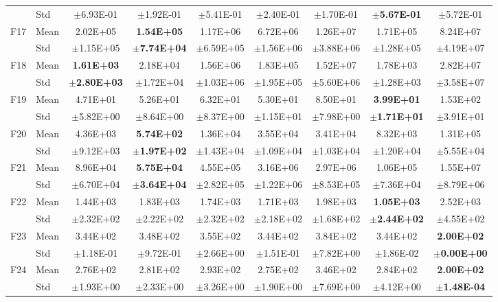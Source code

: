 \begin{table}[htbp]
{\begin{tabular}{clccccccc}
 & Std & $\pm$6.93E-01 & $\pm$1.92E-01 & $\pm$5.41E-01 & $\pm$2.40E-01 & $\pm$1.70E-01 & $\pm$\textbf{5.67E-01} & $\pm$5.72E-01 \\
F17 & Mean & 2.02E+05 & \textbf{1.54E+05} & 1.17E+06 & 6.72E+06 & 1.26E+07 & 1.71E+05 & 8.24E+07 \\
 & Std & $\pm$1.15E+05 & $\pm$\textbf{7.74E+04} & $\pm$6.59E+05 & $\pm$1.56E+06 & $\pm$3.88E+06 & $\pm$1.28E+05 & $\pm$4.19E+07 \\
F18 & Mean & \textbf{1.61E+03} & 2.18E+04 & 1.56E+06 & 1.83E+05 & 1.52E+07 & 1.78E+03 & 2.82E+07 \\
 & Std & $\pm$\textbf{2.80E+03} & $\pm$1.72E+04 & $\pm$1.03E+06 & $\pm$1.95E+05 & $\pm$5.60E+06 & $\pm$1.28E+03 & $\pm$3.58E+07 \\
F19 & Mean & 4.71E+01 & 5.26E+01 & 6.32E+01 & 5.30E+01 & 8.50E+01 & \textbf{3.99E+01} & 1.53E+02 \\
 & Std & $\pm$5.82E+00 & $\pm$8.64E+00 & $\pm$8.37E+00 & $\pm$1.15E+01 & $\pm$7.98E+00 & $\pm$\textbf{1.71E+01} & $\pm$3.91E+01 \\
F20 & Mean & 4.36E+03 & \textbf{5.74E+02} & 1.36E+04 & 3.55E+04 & 3.41E+04 & 8.32E+03 & 1.31E+05 \\
 & Std & $\pm$9.12E+03 & $\pm$\textbf{1.97E+02} & $\pm$1.43E+04 & $\pm$1.09E+04 & $\pm$1.03E+04 & $\pm$1.20E+04 & $\pm$5.55E+04 \\
F21 & Mean & 8.96E+04 & \textbf{5.75E+04} & 4.55E+05 & 3.16E+06 & 2.97E+06 & 1.06E+05 & 1.55E+07 \\
 & Std & $\pm$6.70E+04 & $\pm$\textbf{3.64E+04} & $\pm$2.82E+05 & $\pm$1.22E+06 & $\pm$8.53E+05 & $\pm$7.36E+04 & $\pm$8.79E+06 \\
F22 & Mean & 1.44E+03 & 1.83E+03 & 1.74E+03 & 1.71E+03 & 1.98E+03 & \textbf{1.05E+03} & 2.52E+03 \\
 & Std & $\pm$2.32E+02 & $\pm$2.22E+02 & $\pm$2.32E+02 & $\pm$2.18E+02 & $\pm$1.68E+02 & $\pm$\textbf{2.44E+02} & $\pm$4.55E+02 \\
F23 & Mean & 3.44E+02 & 3.48E+02 & 3.55E+02 & 3.44E+02 & 3.84E+02 & 3.44E+02 & \textbf{2.00E+02} \\
 & Std & $\pm$1.18E-01 & $\pm$9.72E-01 & $\pm$2.66E+00 & $\pm$1.51E-01 & $\pm$7.82E+00 & $\pm$1.86E-02 & $\pm$\textbf{0.00E+00} \\
F24 & Mean & 2.76E+02 & 2.81E+02 & 2.93E+02 & 2.75E+02 & 3.46E+02 & 2.84E+02 & \textbf{2.00E+02} \\
 & Std & $\pm$1.93E+00 & $\pm$2.33E+00 & $\pm$3.26E+00 & $\pm$1.90E+00 & $\pm$7.69E+00 & $\pm$4.12E+00 & $\pm$\textbf{1.48E-04} \\

\end{tabular}}
\end{table}
